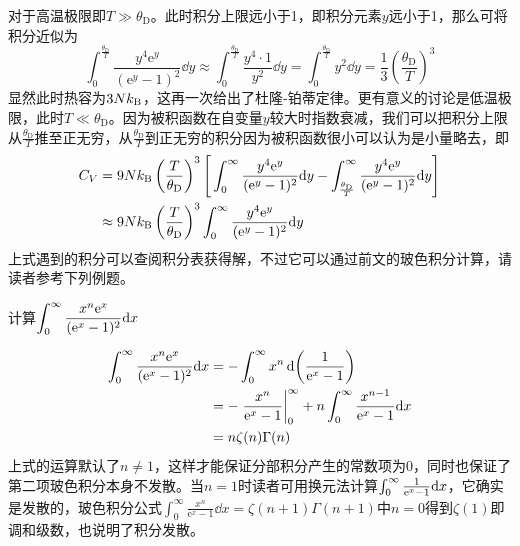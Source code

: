 \documentclass[../../main.tex]{subfiles}
\begin{document}
对于高温极限即\(T\gg\theta_{\mathrm{D}}\)。此时积分上限远小于1，即积分元素\(y\)远小于1，那么可将积分近似为
\begin{equation}
    \int_0^{\frac{\theta_{\mathrm{D}}}{T}}\frac{y^4\mathrm{e}^{y}}{(\mathrm{e}^{y}-1)^2}\dd y\approx \int_0^{\frac{\theta_{\mathrm{D}}}{T}} \frac{y^4\cdot 1}{y^2}\dd y=\int_0^{\frac{\theta_{\mathrm{D}}}{T}} y^2\dd y=\frac{1}{3}\left(\frac{\theta_{\mathrm{D}}}{T}\right)^3
\end{equation}
显然此时热容为\(3Nk_{\mathrm{B}}\)，这再一次给出了杜隆-铂蒂定律。更有意义的讨论是低温极限，此时\(T\ll\theta_{\mathrm{D}}\)。因为被积函数在自变量\(y\)较大时指数衰减，我们可以把积分上限从\(\frac{\theta_{\mathrm{D}}}{T}\)推至正无穷，从\(\frac{\theta_{\mathrm{D}}}{T}\)到正无穷的积分因为被积函数很小可以认为是小量略去，即
\begin{equation}
    \begin{split}
        C_V&=9Nk_{\mathrm{B}}\left(\frac{T}{\theta_{\mathrm{D}}}\right)^3\Bigg[\int_0^{\infty}\frac{y^4\mathrm{e}^{y}}{(\mathrm{e}^{y}-1)^2}\dd y-\int_{\frac{\theta_{\mathrm{D}}}{T}}^{\infty}\frac{y^4\mathrm{e}^{y}}{(\mathrm{e}^{y}-1)^2}\dd y\Bigg] \\
        &\approx9Nk_{\mathrm{B}}\left(\frac{T}{\theta_{\mathrm{D}}}\right)^3\int_0^{\infty}\frac{y^4\mathrm{e}^{y}}{(\mathrm{e}^{y}-1)^2}\dd y
    \end{split}
\end{equation}
上式遇到的积分可以查阅积分表获得解，不过它可以通过前文的玻色积分计算，请读者参考下列例题。
\begin{example}
    计算\(\displaystyle \int_0^{\infty}\frac{x^n\mathrm{e}^{x}}{(\mathrm{e}^{x}-1)^2}\dd x\)
    \begin{solution}
        \begin{equation}
            \begin{split}
                \int_0^{\infty}\frac{x^n\e^{x}}{(\e^{x}-1)^2}\dd x&=-\int_0^{\infty}x^n\dd(\frac{1}{\e^x-1}) \\
                &=-\eval{\frac{x^n}{\e^x-1}}_{0}^{\infty}+n\int_0^{\infty}\frac{x^{n-1}}{\e^x-1}\dd x \\
                &=n\zeta(n)\Gamma(n)
            \end{split}
    \end{equation}
    上式的运算默认了\(n\neq1\)，这样才能保证分部积分产生的常数项为0，同时也保证了第二项玻色积分本身不发散。当\(n=1\)时读者可用换元法计算\(\int_0^{\infty}\frac{1}{\mathrm{e}^x-1}\dd x\)，它确实是发散的，玻色积分公式\(\int_0^{\infty}\frac{x^n}{\mathrm{e}^x-1}\dd x=\zeta(n+1)\Gamma(n+1)\)中\(n=0\)得到\(\zeta(1)\)即调和级数，也说明了积分发散。
    \end{solution}
\end{example}
\end{document}
